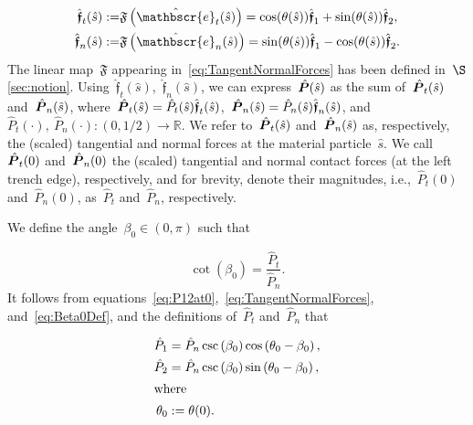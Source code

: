 \documentclass[preprint,10pt,times]{elsarticle}
\numberwithin{equation}{section}
\newcommand{\physe}{\hat{\mathbscr{e}}} %
\newcommand{\physf}{\hat{\boldsymbol{\mathfrak{f}}}}
\renewcommand{\u}[1]{\boldsymbol{#1}}
\newcommand{\chat}[1]{\skew{4}\hat{#1}}
\newcommand{\pr}[1]{\left( #1 \right)}
\begin{document}
\begin{subequations}
\begin{align}
\label{eq:ftstau}
\physf_{t}(\hat{s}):=
&\mathfrak{F}\pr{\physe_{t}(\hat{s})}=\cos(\theta(\hat{s}))\physf_{1}+\sin(\theta(\hat{s}))\physf_{2},\\
\label{eq:fnstau}
\physf_{n}(\hat{s}):=
&\mathfrak{F}\pr{\physe_{n}(\hat{s})}=\sin(\theta(\hat{s}))\physf_{1}-\cos(\theta(\hat{s}))\physf_{2}.
\end{align}
\label{eq:TangentNormalForces}
\end{subequations}The linear map~$\mathfrak{F}$ appearing in~\eqref{eq:TangentNormalForces}
has been defined in~$\S$\ref{sec:notion}. Using~$\physf_{t}(\hat{s})$,~$\physf_{n}(\hat{s})$,
we can express~$\chat{\u{P}}(\hat{s})$ as the sum of~$\chat{\u{P}}_{t}(\hat{s})$
and~$\chat{\u{P}}_{n}(\hat{s})$, where~$\chat{\u{P}}_{t}(\hat{s})=\hat{P}_{t}(\hat{s})\physf_{t}(\hat{s})$,~$\chat{\u{P}}_{n}(\hat{s})=\hat{P}_{n}(\hat{s})\physf_{n}(\hat{s})${,
and}~$\hat{P}_{t}(\cdot),~\hat{P}_{n}(\cdot): (0,1/2)\to\mathbb{R}$.
We refer to~$\chat{\u{P}}_t(\hat{s})$ and~$\chat{\u{P}}_n(\hat{s})$
as, respectively, the (scaled) tangential and normal forces at the
material particle~$\hat{s}$. We call~$\chat{\u{P}}_t(0)$ and~$\chat{\u{P}}_n(0)$
the (scaled) tangential and normal contact forces (at the left trench
edge), respectively, and for brevity, denote their magnitudes, i.e.,~$\hat{P}_{t}(0)$
and~$\hat{P}_{n}(0)$, as~$\hat{P}_{t}$ and~$\hat{P}_{n}$, respectively.

We define the angle~$\beta_0\in (0,\pi)$ such that

\begin{equation}
\cot\pr{\beta_0} =\frac{\hat{P}_{t}}{\hat{P}_{n}}.
\label{eq:Beta0Def}
\end{equation}It follows from equations~\eqref{eq:P12at0},~\eqref{eq:TangentNormalForces},
and~\eqref{eq:Beta0Def}, and the definitions of~$\hat{P}_{t}$
and~$\hat{P}_{n}$ that

\begin{subequations}
\begin{align}
\hat{P}_{1}&=\hat{P}_{n}\csc\pr{\beta_0}\cos\pr{\theta_0-\beta_0},
\label{eq:P1}
\\
\hat{P}_{2}& =\hat{P}_{n}\csc\pr{\beta_0}\sin\pr{\theta_0-\beta_0},
\label{eq:P2}
\\
\intertext{where}
\label{eq:Theta0}
\theta_{0}&:=\theta(0).
\end{align}
\label{eq:P1P2intoPn}
\end{subequations}
\end{document}
